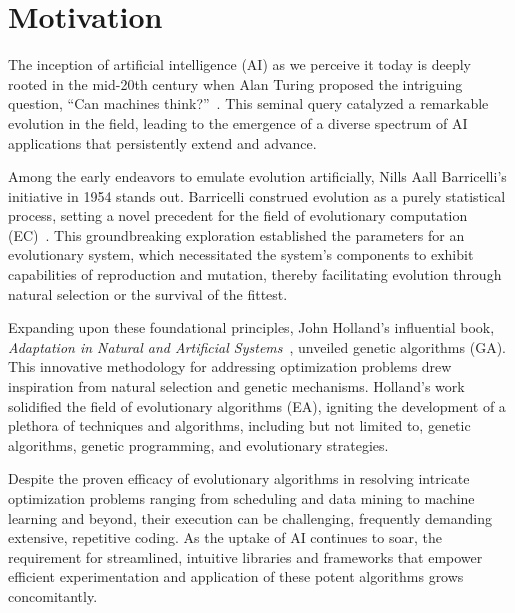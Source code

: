 \section{Motivation}
\label{sec:motivation}
  The inception of artificial intelligence (AI) as we perceive it today is 
  deeply rooted in the mid-20th century when Alan Turing proposed the intriguing 
  question, \enquote{Can machines think?}~\autocite{turingCOMPUTINGMACHINERYINTELLIGENCE1950a}.
  This seminal query catalyzed a remarkable evolution in the field, leading to the emergence of a diverse spectrum of AI applications that persistently extend and advance.

  Among the early endeavors to emulate evolution artificially, Nills Aall 
  Barricelli's initiative in 1954 stands out.
  Barricelli construed evolution as a purely statistical process, setting a 
  novel precedent for the field of evolutionary computation 
  (EC)~\autocite{barricelliNumericalTestingEvolution1962}.
  This groundbreaking exploration established the parameters for an evolutionary 
  system, which necessitated the system's components to exhibit capabilities of 
  reproduction and mutation, thereby facilitating evolution through natural 
  selection or the survival of the fittest.

  Expanding upon these foundational principles, John Holland's influential book, 
  \emph{Adaptation in Natural and Artificial 
  Systems}~\autocite{hollandAdaptationNaturalArtificial1992a}, unveiled genetic 
  algorithms (GA).
  This innovative methodology for addressing optimization problems drew 
  inspiration from natural selection and genetic mechanisms.
  Holland's work solidified the field of evolutionary algorithms (EA), igniting 
  the development of a plethora of techniques and algorithms, including but not 
  limited to, genetic algorithms, genetic programming, and evolutionary 
  strategies.

  Despite the proven efficacy of evolutionary algorithms in resolving intricate 
  optimization problems ranging from scheduling and data mining to machine 
  learning and beyond, their execution can be challenging, frequently demanding 
  extensive, repetitive coding.
  As the uptake of AI continues to soar, the requirement for streamlined, 
  intuitive libraries and frameworks that empower efficient experimentation and 
  application of these potent algorithms grows concomitantly.

